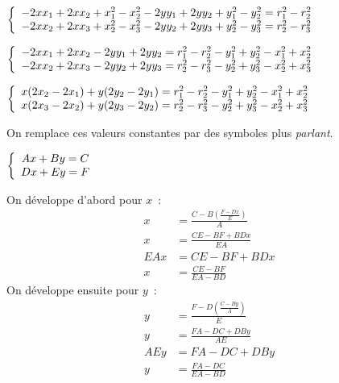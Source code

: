 \documentclass[11pt,a4paper]{article}
\begin{document}
      \begin{center}
        $\left \{
        \begin{array}{c c}
          -2xx_{1}+2xx_{2}+x_{1}^{2}-x_{2}^{2}-2yy_{1}+2yy_{2}+y_{1}^{2}-y_{2}^{2} = r_{1}^{2}-r_{2}^{2} \\
          -2xx_{2}+2xx_{3}+x_{2}^{2}-x_{3}^{2}-2yy_{2}+2yy_{3}+y_{2}^{2}-y_{3}^{2} = r_{2}^{2}-r_{3}^{2}
        \end{array}
        \right.$
      \end{center}
      \begin{center}
        $\left \{
        \begin{array}{c c}
          -2xx_{1}+2xx_{2}-2yy_{1}+2yy_{2} = r_{1}^{2}-r_{2}^{2}-y_{1}^{2}+y_{2}^{2}-x_{1}^{2}+x_{2}^{2} \\
          -2xx_{2}+2xx_{3}-2yy_{2}+2yy_{3} = r_{2}^{2}-r_{3}^{2}-y_{2}^{2}+y_{3}^{2}-x_{2}^{2}+x_{3}^{2}
        \end{array}
        \right.$
      \end{center}
      \begin{center}
        $\left \{
        \begin{array}{c c}
          x(2x_{2}-2x_{1})+y(2y_{2}-2y_{1}) = r_{1}^{2}-r_{2}^{2}-y_{1}^{2}+y_{2}^{2}-x_{1}^{2}+x_{2}^{2} \\
          x(2x_{3}-2x_{2})+y(2y_{3}-2y_{2}) = r_{2}^{2}-r_{3}^{2}-y_{2}^{2}+y_{3}^{2}-x_{2}^{2}+x_{3}^{2}
        \end{array}
        \right.$
      \end{center}
      On remplace ces valeurs constantes par des symboles plus \textit{parlant}.
      \begin{center}
        $\left \{
        \begin{array}{c c}
          Ax+By = C \\
          Dx+Ey = F
        \end{array}
        \right.$
      \end{center}
      On développe d'abord pour $x$~:
      \begin{align*}
        x &= \frac{C-B(\frac{F-Dx}{E})}{A} \\
        x &= \frac{CE-BF+BDx}{EA} \\
        EAx &= CE-BF+BDx \\
        x &= \frac{CE-BF}{EA-BD}
      \end{align*}
      On développe ensuite pour $y$~:
      \begin{align*}
        y &= \frac{F-D(\frac{C-By}{A})}{E} \\
        y &= \frac{FA-DC+DBy}{AE} \\
        AEy &= FA-DC+DBy \\
        y &= \frac{FA-DC}{EA-BD}
      \end{align*}
\end{document}
